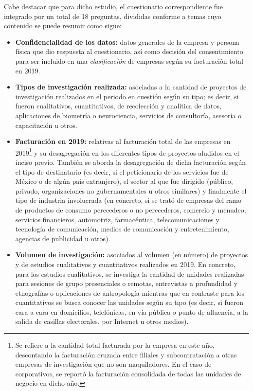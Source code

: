 Cabe destacar que para dicho estudio, el cuestionario correspondiente fue integrado por un total de 18 preguntas, divididas conforme a temas cuyo contenido se puede resumir como sigue: 
\begin{itemize}
    \item[i)] \textbf{Confidencialidad de los datos:} datos generales de la empresa y persona física que dio respuesta al cuestionario, así como decisión del consentimiento para ser incluido en una \textit{clasificación} de empresas según su facturación total en 2019. 
    \item[ii)] \textbf{Tipos de investigación realizada:} asociadas a la cantidad de proyectos de investigación realizados en el periodo en cuestión según su tipo; es decir, si fueron cualitativos, cuantitativos, de recolección y analítica de datos, aplicaciones de biometría o neurociencia, servicios de consultoría, asesoría o capacitación u otros.
    \item[iii)] \textbf{Facturación en 2019:} relativas al facturación total de las empresas en 2019\footnote{Se refiere a la cantidad total facturada por la empresa en este año, descontando la facturación cruzada entre filiales y subcontratación a otras empresas de investigación que no son maquiladores. En el caso de corporativos, se reportó la facturación consolidada de todas las unidades de negocio en dicho año.} y su desagregación en los diferentes tipos de proyectos aludidos en el inciso previo. También se aborda la desagregación de dicha facturación según el tipo de destinatario (es decir, si el peticionario de los servicios fue de México o de algún país extranjero), el sector al que fue dirigido (público, privado, organizaciones no gubernamentales u otros similares) y finalmente el tipo de industria involucrada (en concreto, si se trató de empresas del ramo de productos de consumo perecederos o no perecederos, comercio y menudeo, servicios financieros, automotriz, farmacéutica, telecomunicaciones y tecnología de comunicación, medios de comunicación y entretenimiento, agencias de publicidad u otros).
    \item[iv)] \textbf{Volumen de investigación:} asociados al volumen (en número) de proyectos y de estudios cualitativos y cuantitativos realizados en 2019. En concreto, para los estudios cualitativos, se investiga la cantidad de unidades realizadas para sesiones de grupo presenciales o remotas, entrevistas a profundidad y etnografías o aplicaciones de antropología mientras que en contraste para los cuantitativos se busca conocer las unidades según su tipo (es decir, si fueron cara a cara en domicilios, telefónicas, en vía pública o punto de afluencia, a la salida de casillas electorales, por Internet u otros medios).

\end{itemize}
